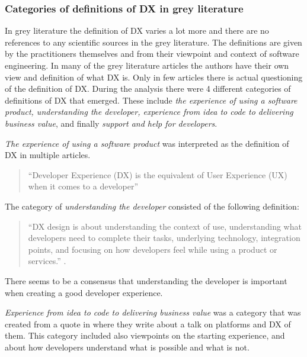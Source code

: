 \documentclass[english, 12pt, a4paper, sci, utf8, a-1b, online]{aaltothesis}
\begin{document}
\subsubsection{Categories of definitions of DX in grey literature}

In grey literature the definition of DX varies a lot more and there are no references to any scientific sources in the grey literature. The definitions are given by the practitioners themselves and from their viewpoint and context of software engineering. In many of the grey literature articles the authors have their own view and definition of what DX is. Only in few articles there is actual questioning of the definition of DX. During the analysis there were 4 different categories of definitions of DX that emerged. These include \textit{the experience of using a software product, understanding the developer, experience from idea to code to delivering business value}, and finally \textit{support and help for developers}.

\textit{The experience of using a software product} was interpreted as the definition of DX in multiple articles.

\begin{quote}
  ``Developer Experience (DX) is the equivalent of User Experience (UX) when it comes to a developer'' \parencite{the-best-practices-for-a-great-dx}
\end{quote}

\noindent The category of \textit{understanding the developer} consisted of the following definition:

\begin{quote}
  ``DX design is about understanding the context of use, understanding what developers need to complete their tasks, underlying technology, integration points, and focusing on how developers feel while using a product or services.'' \parencite{building-the-developer-experience-from-the-ground-up}.
\end{quote}

\noindent There seems to be a consensus that understanding the developer is important when creating a good developer experience.

\textit{Experience from idea to code to delivering business value} was a category that was created from a quote in \textcite{workflows-for-the-new-developer-experience} where they write about a talk on platforms and DX of them. This category included also viewpoints on the starting experience, and about how developers understand what is possible and what is not.
\end{document}
